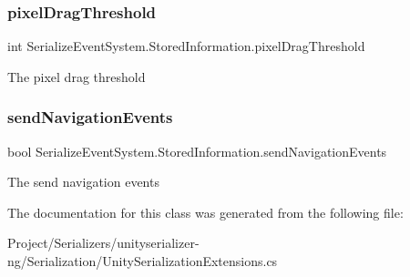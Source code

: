 \subsubsection{\texorpdfstring{pixel\+Drag\+Threshold}{pixelDragThreshold}}
{\footnotesize\ttfamily int Serialize\+Event\+System.\+Stored\+Information.\+pixel\+Drag\+Threshold}



The pixel drag threshold 

\mbox{\label{class_serialize_event_system_1_1_stored_information_a33a91656b50f4b8030d2caf7a44fff11}} 
\subsubsection{\texorpdfstring{send\+Navigation\+Events}{sendNavigationEvents}}
{\footnotesize\ttfamily bool Serialize\+Event\+System.\+Stored\+Information.\+send\+Navigation\+Events}



The send navigation events 



The documentation for this class was generated from the following file\+:\begin{DoxyCompactItemize}
\item 
Project/\+Serializers/unityserializer-\/ng/\+Serialization/Unity\+Serialization\+Extensions.\+cs\end{DoxyCompactItemize}
